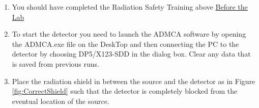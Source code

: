 \documentclass{../lab}
\begin{document}
\begin{enumerate}
    \item You should have completed the Radiation Safety Training above \hyperref[sec:BeforeTheLab]{Before the Lab}

    \item To start the detector you need to launch the ADMCA software by opening the ADMCA.exe file on the DeskTop and then connecting the PC to the detector by choosing DP5/X123-SDD in the dialog box. Clear any data that is saved from previous runs.
    
    \item Place the radiation shield in between the source and the detector as in Figure \ref{fig:CorrectShield} such that the detector is completely blocked from the eventual location of the source. 
    

\end{enumerate}
\end{document}
